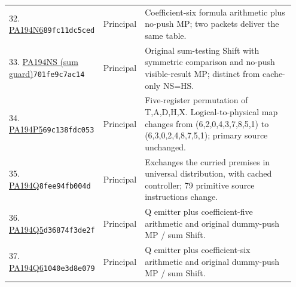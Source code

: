 \begin{longtable}{@{}p{0.27\linewidth}p{0.13\linewidth}p{0.55\linewidth}@{}}
32. \href{https://github.com/VladimirReshetnikov/ProveIt/blob/32d0d8b7d93a63ad4106c18cdb29b37927acdad2/Computability/BusyBeaver/Research/PA/docs/pa194n5_n6_conpa_2026-11-13/machines/pa194n6.tm}{PA194N6}\newline\texttt{89fc11dc5ced} & Principal & Coefficient-six formula arithmetic plus no-push MP; two packets deliver the same table.\\[5pt]
33. \href{https://github.com/VladimirReshetnikov/ProveIt/blob/32d0d8b7d93a63ad4106c18cdb29b37927acdad2/Computability/BusyBeaver/Research/PA/docs/PA194NS_research/pa194ns.tm}{PA194NS (sum guard)}\newline\texttt{701fe9c7ac14} & Principal & Original sum-testing Shift with symmetric comparison and no-push visible-result MP; distinct from cache-only NS=HS.\\[5pt]
34. \href{https://github.com/VladimirReshetnikov/ProveIt/blob/32d0d8b7d93a63ad4106c18cdb29b37927acdad2/Computability/BusyBeaver/Research/PA/docs/pa194p5_research_2026-11-14/machine/pa194p5.tm}{PA194P5}\newline\texttt{69c138fdc053} & Principal & Five-register permutation of T,A,D,H,X. Logical-to-physical map changes from (6,2,0,4,3,7,8,5,1) to (6,3,0,2,4,8,7,5,1); primary source unchanged.\\[5pt]
35. \href{https://github.com/VladimirReshetnikov/ProveIt/blob/32d0d8b7d93a63ad4106c18cdb29b37927acdad2/Computability/BusyBeaver/Research/PA/docs/pa194q_conpa_2026-11-13/machine/pa194q.tm}{PA194Q}\newline\texttt{8fee94fb004d} & Principal & Exchanges the curried premises in universal distribution, with cached controller; 79 primitive source instructions change.\\[5pt]
36. \href{https://github.com/VladimirReshetnikov/ProveIt/blob/32d0d8b7d93a63ad4106c18cdb29b37927acdad2/Computability/BusyBeaver/Research/PA/docs/pa194_qradix_research_2026-11-13/machines/PA194Q5/machine.tm}{PA194Q5}\newline\texttt{d36874f3de2f} & Principal & Q emitter plus coefficient-five arithmetic and original dummy-push MP / sum Shift.\\[5pt]
37. \href{https://github.com/VladimirReshetnikov/ProveIt/blob/32d0d8b7d93a63ad4106c18cdb29b37927acdad2/Computability/BusyBeaver/Research/PA/docs/pa194_qradix_research_2026-11-13/machines/PA194Q6/machine.tm}{PA194Q6}\newline\texttt{1040e3d8e079} & Principal & Q emitter plus coefficient-six arithmetic and original dummy-push MP / sum Shift.\\[5pt]

\end{longtable}
